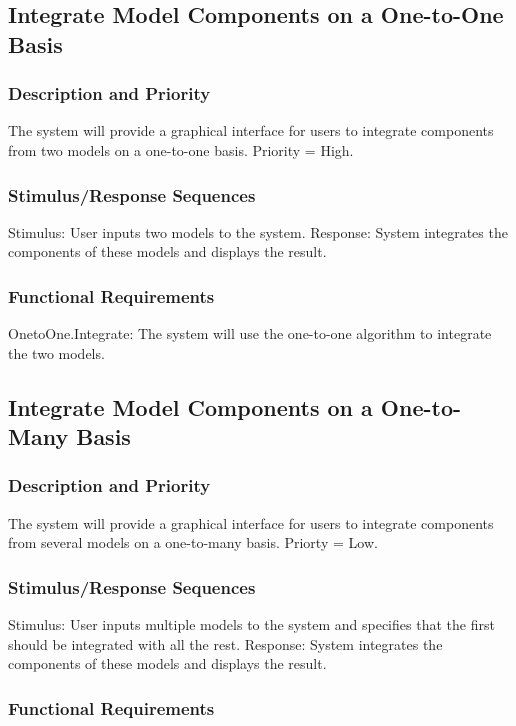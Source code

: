 \documentclass{article}
\begin{document}
\subsection{Integrate Model Components on a One-to-One Basis}

\subsubsection{Description and Priority}
The system will provide a graphical interface for users to integrate components from two models on a one-to-one basis.  Priority = High.

\subsubsection{Stimulus/Response Sequences}
Stimulus: User inputs two models to the system.
Response: System integrates the components of these models and displays the result.

\subsubsection{Functional Requirements}
OnetoOne.Integrate: The system will use the one-to-one algorithm to integrate the two models.

\subsection{Integrate Model Components on a One-to-Many Basis}
\subsubsection{Description and Priority}
The system will provide a graphical interface for users to integrate components from several models on a one-to-many basis.  Priorty = Low.

\subsubsection{Stimulus/Response Sequences}

Stimulus: User inputs multiple models to the system and specifies that the first should be integrated with all the rest.
Response: System integrates the components of these models and displays the result.

\subsubsection{Functional Requirements}
\end{document}
